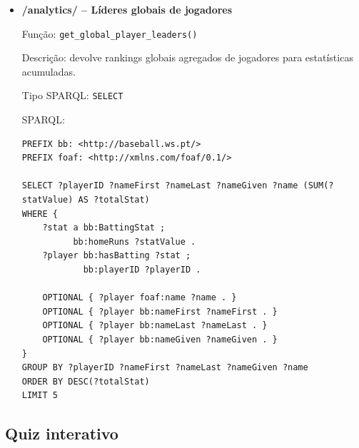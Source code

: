 \begin{itemize}[leftmargin=*]
  \item \textbf{/analytics/ -- Líderes globais de jogadores}
  
  Fun\c{c}\~ao: \texttt{get\_global\_player\_leaders()}
  
  Descri\c{c}\~ao: devolve rankings globais agregados de jogadores para estatísticas acumuladas.
  
  Tipo SPARQL: \texttt{SELECT}

  SPARQL:

\begin{Verbatim}[fontsize=\scriptsize,breaklines=true]
PREFIX bb: <http://baseball.ws.pt/>
PREFIX foaf: <http://xmlns.com/foaf/0.1/>

SELECT ?playerID ?nameFirst ?nameLast ?nameGiven ?name (SUM(?statValue) AS ?totalStat)
WHERE {
    ?stat a bb:BattingStat ;
          bb:homeRuns ?statValue .
    ?player bb:hasBatting ?stat ;
            bb:playerID ?playerID .

    OPTIONAL { ?player foaf:name ?name . }
    OPTIONAL { ?player bb:nameFirst ?nameFirst . }
    OPTIONAL { ?player bb:nameLast ?nameLast . }
    OPTIONAL { ?player bb:nameGiven ?nameGiven . }
}
GROUP BY ?playerID ?nameFirst ?nameLast ?nameGiven ?name
ORDER BY DESC(?totalStat)
LIMIT 5
\end{Verbatim}
\end{itemize}

\subsection{Quiz interativo}

